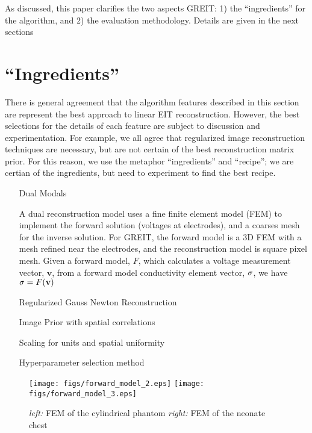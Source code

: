\documentclass[letterpaper,twocolumn,11pt]{article}
\newcommand{\vB}{\mbox{$\mathbf{v}$}}
\newcommand{\sG}{\mbox{${\boldmath \sigma}$}}
\begin{document}
As discussed, this paper clarifies the two aspects GREIT:
1) the ``ingredients'' for the algorithm, and
2) the evaluation methodology. Details are given in the
next sections

\section{``Ingredients''}

There is general agreement that the algorithm features
described in this section are represent the best approach
to linear EIT reconstruction. However, the best selections
for the details of each feature are subject to discussion
and experimentation. For example, we all agree that
regularized image reconstruction techniques are necessary,
but are not certain of the best reconstruction matrix prior.
For this reason, we use the metaphor ``ingredients'' and
``recipe''; we are certian of the ingredients, but need
to experiment to find the best recipe.

\begin{itemize}
\item[Dual Modals]

A dual reconstruction model uses a fine finite element
model (FEM) to implement the forward solution (voltages
at electrodes), and a coarses mesh for the inverse
solution. For GREIT, the forward model is a 3D FEM with
a mesh refined near the electrodes, and the reconstruction
model is square pixel mesh. Given a forward model, $F$,
which calculates a voltage measurement vector, $\vB$, from
a forward model conductivity element vector, $\sG$, we
have $\sG = F( \vB )$ 

\item[Regularized Gauss Newton Reconstruction]



\item[Image Prior with spatial correlations]

\item[Scaling for units and spatial uniformity]

\item[Hyperparameter selection method]

\end{itemize}



\begin{figure}[bhtp]
\begin{center}
  \texttt{[image: figs/forward\_model\_2.eps]}
  \texttt{[image: figs/forward\_model\_3.eps]}

\caption{ \label{fig:fm2}
{\em left:} FEM of the cylindrical phantom
{\em right:} FEM of the neonate chest 
}
\end{center}
\end{figure}
\end{document}
